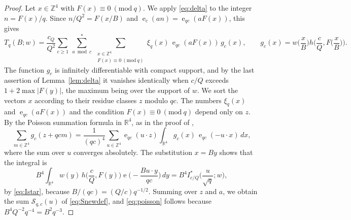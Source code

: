 \documentclass[11pt]{amsart}
\numberwithin{equation}{section}
\numberwithin{figure}{section}
\theoremstyle{definition}
\newcommand{\Z}{\mathbb{Z}}
\newcommand{\R}{\mathbb{R}}
\newcommand{\F}{\mathcal{F}}
\newcommand{\e}{\operatorname{e}}
\newcommand{\imod}[1]{\ (\mathrm{mod}\ #1)}
\newcommand{\abs}[1]{\lvert #1\rvert}
\begin{document}
\begin{proof}
Let $x\in\Z^4$ with $F(x)\equiv0\imod q$. We apply \eqref{eq:delta}
to the integer $n=F(x)/q$. Since $n/Q^2=F(x/B)$ and
$\e_c(an)=\e_{qc}(aF(x))$, this gives
\[
 T_q(B;w)=\frac{c_Q}{Q^2}\sum_{c\ge1}\ \sum_{a\bmod c}^{*}\
 \sum_{\substack{x\in\Z^4\\F(x)\equiv0\imod q}}
 \xi_q(x)\,\e_{qc}(aF(x))\,g_c(x),
 \qquad g_c(x)=w\Big(\frac xB\Big)h\bigg(\frac cQ,F\Big(\frac xB\Big)\bigg).
\]
The function $g_c$ is infinitely differentiable with compact support,
and by the last assertion of Lemma~\ref{lem:delta} it vanishes
identically when $c/Q$ exceeds $1+2\max\abs{F(y)}$, the maximum being
over the support of $w$. We sort the vectors $x$ according to their
residue classes $z$ modulo $qc$. The numbers $\xi_q(x)$ and
$\e_{qc}(aF(x))$ and the condition $F(x)\equiv0\imod q$ depend only
on $z$. By the Poisson summation formula in $\R^4$, as in the proof
of \cite[Theorem~2]{HB},
\[
 \sum_{m\in\Z^4}g_c(z+qcm)=\frac1{(qc)^4}\sum_{u\in\Z^4}
 \e_{qc}(u\cdot z)\int_{\R^4}g_c(x)\,\e_{qc}(-u\cdot x)\,dx,
\]
where the sum over $u$ converges absolutely. The substitution $x=By$
shows that the integral is
\[
 B^4\int_{\R^4}w(y)\,h\Big(\frac cQ,F(y)\Big)
 \e\Big(-\frac{Bu\cdot y}{qc}\Big)\,dy
 =B^4I_{c/Q}^*\Big(\frac u{\sqrt q};w\Big),
\]
by \eqref{eq:Istar}, because $B/(qc)=(Q/c)q^{-1/2}$. Summing over $z$
and $a$, we obtain the sum $\mathcal S_{q,c}(u)$ of
\eqref{eq:Snewdef}, and \eqref{eq:poisson} follows because
$B^4Q^{-2}q^{-4}=B^2q^{-3}$.
\end{proof}
\end{document}
